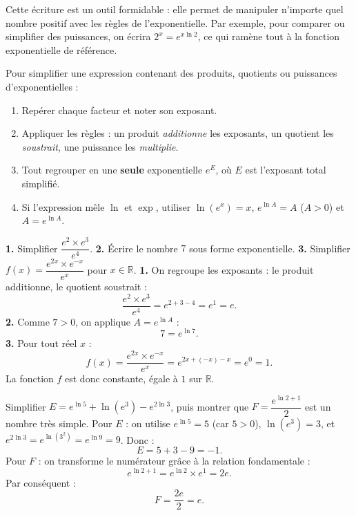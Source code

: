 \documentclass[11pt]{article}
\begin{document}
Cette écriture est un outil formidable : elle permet de manipuler n'importe quel nombre positif avec les règles de l'exponentielle. Par exemple, pour comparer ou simplifier des puissances, on écrira $2^{x} = e^{x \ln 2}$, ce qui ramène tout à la fonction exponentielle de référence.

\begin{methode}
Pour simplifier une expression contenant des produits, quotients ou puissances d'exponentielles :
\begin{enumerate}
\item Repérer chaque facteur et noter son exposant.
\item Appliquer les règles : un produit \emph{additionne} les exposants, un quotient les \emph{soustrait}, une puissance les \emph{multiplie}.
\item Tout regrouper en une \textbf{seule} exponentielle $e^{E}$, où $E$ est l'exposant total simplifié.
\item Si l'expression mêle $\ln$ et $\exp$, utiliser $\ln(e^x) = x$, $e^{\ln A} = A$ ($A>0$) et $A = e^{\ln A}$.
\end{enumerate}
\end{methode}

\begin{exoresolu}
\textbf{1.} Simplifier $\dfrac{e^{2} \times e^{3}}{e^{4}}$.
\textbf{2.} Écrire le nombre $7$ sous forme exponentielle.
\textbf{3.} Simplifier $f(x) = \dfrac{e^{2x} \times e^{-x}}{e^{x}}$ pour $x \in \mathbb{R}$.
\tcblower
\textbf{1.} On regroupe les exposants : le produit additionne, le quotient soustrait :
\[
\frac{e^{2} \times e^{3}}{e^{4}} = e^{2+3-4} = e^{1} = e.
\]
\textbf{2.} Comme $7 > 0$, on applique $A = e^{\ln A}$ :
\[
7 = e^{\ln 7}.
\]
\textbf{3.} Pour tout réel $x$ :
\[
f(x) = \frac{e^{2x} \times e^{-x}}{e^{x}} = e^{2x + (-x) - x} = e^{0} = 1.
\]
La fonction $f$ est donc constante, égale à $1$ sur $\mathbb{R}$.
\end{exoresolu}

\begin{exoresolu}
Simplifier $E = e^{\ln 5} + \ln\left(e^{3}\right) - e^{2\ln 3}$, puis montrer que $F = \dfrac{e^{\ln 2 + 1}}{2}$ est un nombre très simple.
\tcblower
Pour $E$ : on utilise $e^{\ln 5} = 5$ (car $5 > 0$), $\ln(e^3) = 3$, et $e^{2\ln 3} = e^{\ln(3^2)} = e^{\ln 9} = 9$. Donc :
\[
E = 5 + 3 - 9 = -1.
\]
Pour $F$ : on transforme le numérateur grâce à la relation fondamentale :
\[
e^{\ln 2 + 1} = e^{\ln 2} \times e^{1} = 2e.
\]
Par conséquent :
\[
F = \frac{2e}{2} = e.
\]
\end{exoresolu}
\end{document}
